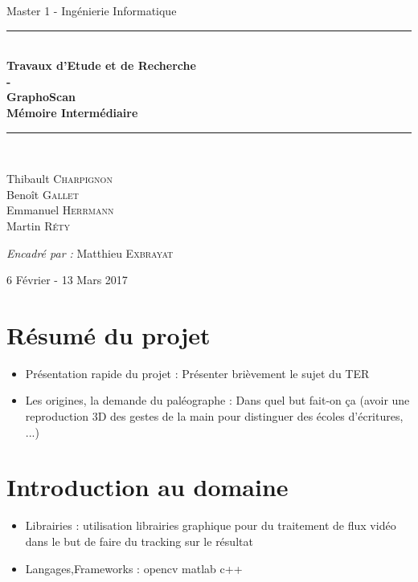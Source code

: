 \documentclass{article}
\begin{document}
\begin{center}
{\large Master 1 - Ingénierie Informatique} \\ [0.5cm]
\vfill
\rule{\linewidth}{0.4mm} \\ [0.4cm]
{\huge \bfseries
Travaux d'Etude et de Recherche\\
- \\
GraphoScan \\ [0.4cm]
Mémoire Intermédiaire \\ [0.4cm]
}
\rule{\linewidth}{0.4mm} \\ [1.5cm]

\begin{minipage}{0.4\textwidth}
\begin{flushleft} \large
Thibault \textsc{Charpignon} \\
Benoît \textsc{Gallet} \\
Emmanuel \textsc{Herrmann} \\
Martin \textsc{Réty}
\end{flushleft}
\end{minipage}

\vfill

\large\emph{Encadré par : }{Matthieu \textsc{Exbrayat}}

\vfill


{\large 6 Février - 13 Mars 2017}

\end{center}

\newpage
 
\tableofcontents

\newpage
 
\section{Résumé du projet}



\begin{itemize}
\item Présentation rapide du projet : Présenter brièvement le sujet du TER
\item Les origines, la demande du paléographe : Dans quel but fait-on ça (avoir une reproduction 3D des gestes de la main pour distinguer des écoles d'écritures, ...)
\end{itemize}
\section{Introduction au domaine}
\begin{itemize}
\item Librairies : utilisation librairies graphique pour du traitement de flux vidéo dans le but de faire du tracking sur le résultat
\item Langages,Frameworks : opencv matlab c++
\end{itemize}
\end{document}
